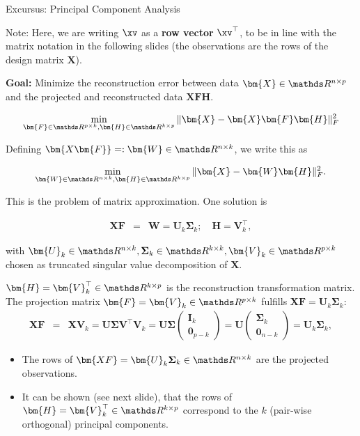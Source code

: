 \begin{vbframe}{Excursus: Principal Component Analysis}
\begin{footnotesize}
	Note: Here, we are writing $\xv$ as a \textbf{row vector} $\xv^\top$, to be in line with the matrix notation in the following slides (the observations are the rows of the design matrix $\bm{X}$).
\end{footnotesize}

\framebreak

\textbf{Goal:} Minimize the reconstruction error between data $\bm{X} \in \R^{n \times p}$ and the projected and reconstructed data $\bm{XFH}$.

$$
\min_{\bm{F} \in \R^{p \times k}, \bm{H} \in \R^{k \times p}} \|\bm{X} - \bm{X}\bm{F}\bm{H}\|^2_F
$$

Defining $\bm{X\bm{F}} =: \bm{W} \in \R^{n \times k}$, we write this as 

$$
\min_{\bm{W} \in \R^{n \times k}, \bm{H} \in \R^{k \times p}} \|\bm{X} - \bm{W}\bm{H}\|^2_F.
$$

This is the problem of matrix approximation. One solution is 

\begin{eqnarray*}
\bm{XF} &=&\bm{W} = \mathbf{U}_k \boldsymbol{\Sigma}_k; \quad \bm{H} =  \mathbf{V}_k^\top, 
\end{eqnarray*}

with $\bm{U}_k \in \R^{n \times k}, \boldsymbol{\Sigma}_k \in \R^{k \times k}, \bm{V}_k \in \R^{p \times k}$ chosen as truncated singular value decomposition of $\bm{X}$.

\lz 

$\bm{H} = \bm{V}_k^\top \in \R^{k \times p}$ is the reconstruction transformation matrix. The projection matrix $\bm{F} = \bm{V}_k \in \R^{p \times k}$ fulfills $\bm{XF} = \bm{U}_k \bm{\Sigma}_k$:
\begin{eqnarray*}
\bm{XF} &=& \bm{X}\bm{V}_k = \bm{U\Sigma V}^\top \bm{V}_k = \bm{U}\bm{\Sigma} \begin{pmatrix} \bm{I}_k \\ \bm{0}_{p - k}\end{pmatrix} = \bm{U} \begin{pmatrix} \bm{\Sigma}_k \\ \bm{0}_{n - k} \end{pmatrix} = \bm{U}_k \bm{\Sigma}_k,
\end{eqnarray*}

\begin{itemize}
	\item The rows of $\bm{XF} = \bm{U}_k \boldsymbol{\Sigma}_k \in \R^{n \times k}$ are the projected observations. 
	\item It can be shown (see next slide), that the rows of $\bm{H} = \bm{V}_k^\top \in \R^{k \times p}$ correspond to the $k$ (pair-wise orthogonal) principal components.
\end{itemize}


\end{vbframe}
